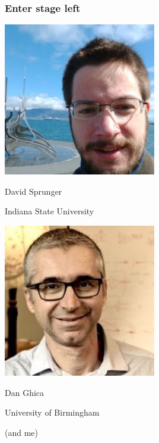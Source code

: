 \begin{frame}
    \frametitle{Enter stage left}

    \centering
    \pause
    \begin{minipage}{0.49\textwidth}
        \centering
        \includegraphics[width=0.5\textwidth]{imgs/sprunger}

        David Sprunger

        \scriptsize
        Indiana State University
    \end{minipage}
    \pause
    \begin{minipage}{0.49\textwidth}
        \centering
        \includegraphics[width=0.5\textwidth]{imgs/ghica}

        Dan Ghica

        \scriptsize
        University of Birmingham
    \end{minipage}

    \pause
    \scriptsize
    (and me)
\end{frame}
